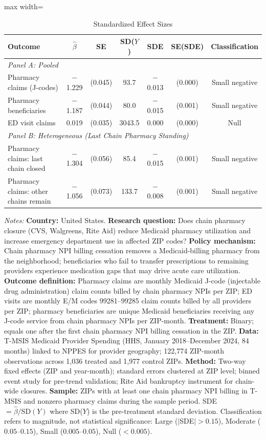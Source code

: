 \begin{table}[t]
\centering
\caption{Standardized Effect Sizes}\label{tab:sde}
\begin{adjustbox}{max width=\textwidth}
\begin{tabular}{lcccccc}
\hline\hline
Outcome & $\hat{\beta}$ & SE & SD($Y$) & SDE & SE(SDE) & Classification \\
\hline
\multicolumn{7}{l}{\textit{Panel A: Pooled}} \\
  Pharmacy claims (J-codes) & $-$1.229 & (0.045) & 93.7 & $-$0.013 & (0.000) & Small negative \\
  Pharmacy beneficiaries & $-$1.187 & (0.044) & 80.0 & $-$0.015 & (0.001) & Small negative \\
  ED visit claims & 0.019 & (0.035) & 3043.5 & 0.000 & (0.000) & Null \\
\hline
\multicolumn{7}{l}{\textit{Panel B: Heterogeneous (Last Chain Pharmacy Standing)}} \\
  Pharmacy claims: last chain closed & $-$1.304 & (0.056) & 85.4 & $-$0.015 & (0.001) & Small negative \\
  Pharmacy claims: other chains remain & $-$1.056 & (0.073) & 133.7 & $-$0.008 & (0.001) & Small negative \\
\hline\hline
\end{tabular}
\end{adjustbox}
\par\vspace{0.5em}
{\scriptsize \textit{Notes:}
\textbf{Country:} United States.
\textbf{Research question:} Does chain pharmacy closure (CVS, Walgreens, Rite Aid) reduce Medicaid pharmacy utilization and increase emergency department use in affected ZIP codes?
\textbf{Policy mechanism:} Chain pharmacy NPI billing cessation removes a Medicaid-billing pharmacy from the neighborhood; beneficiaries who fail to transfer prescriptions to remaining providers experience medication gaps that may drive acute care utilization.
\textbf{Outcome definition:} Pharmacy claims are monthly Medicaid J-code (injectable drug administration) claim counts billed by chain pharmacy NPIs per ZIP; ED visits are monthly E/M codes 99281--99285 claim counts billed by all providers per ZIP; pharmacy beneficiaries are unique Medicaid beneficiaries receiving any J-code service from chain pharmacy NPIs per ZIP-month.
\textbf{Treatment:} Binary; equals one after the first chain pharmacy NPI billing cessation in the ZIP.
\textbf{Data:} T-MSIS Medicaid Provider Spending (HHS, January 2018--December 2024, 84 months) linked to NPPES for provider geography; 122,774 ZIP-month observations across 1,036 treated and 1,977 control ZIPs.
\textbf{Method:} Two-way fixed effects (ZIP and year-month); standard errors clustered at ZIP level; binned event study for pre-trend validation; Rite Aid bankruptcy instrument for chain-wide closures.
\textbf{Sample:} ZIPs with at least one chain pharmacy NPI billing in T-MSIS and nonzero pharmacy claims during the sample period.
SDE $= \hat{\beta} / \text{SD}(Y)$ where SD($Y$) is the pre-treatment standard deviation.
Classification refers to magnitude, not statistical significance: Large ($|$SDE$| > 0.15$), Moderate ($0.05$--$0.15$), Small ($0.005$--$0.05$), Null ($< 0.005$).}
\end{table}
